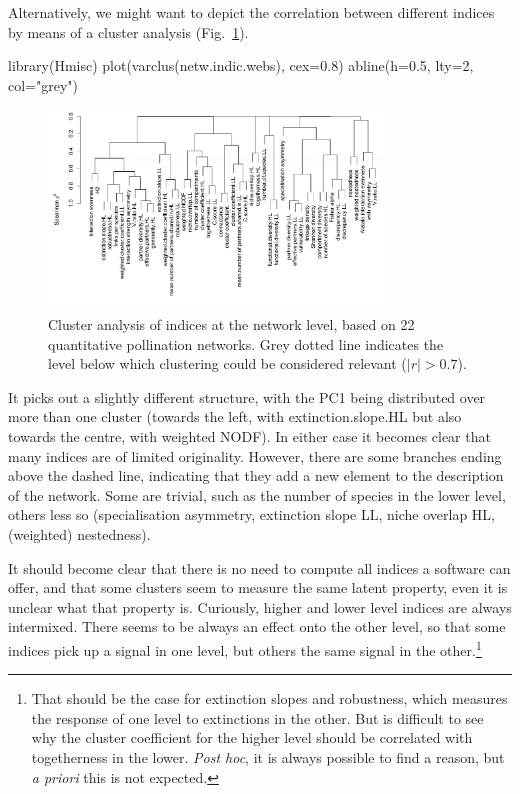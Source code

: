 \documentclass[a4paper, 11pt]{article}\usepackage[]{graphicx}\usepackage[]{color}
\begin{document}
Alternatively, we might want to depict the correlation between different indices by means of a cluster analysis (Fig.~\ref{fig:clusternetworklevel}).
\begin{Schunk}
\begin{Sinput}
library(Hmisc)
plot(varclus(netw.indic.webs), cex=0.8)
abline(h=0.5, lty=2, col="grey")
\end{Sinput}
\end{Schunk}
\begin{figure}
\centering
\includegraphics[width=0.8\textwidth]{figures/clusternetworklevel}
\caption{Cluster analysis of indices at the network level, based on 22 quantitative pollination networks. Grey dotted line indicates the level below which clustering could be considered relevant ($|r| > 0.7$).}
\label{fig:clusternetworklevel}
\end{figure}
%
It picks out a slightly different structure, with the PC1 being distributed over more than one cluster (towards the left, with extinction.slope.HL but also towards the centre, with weighted NODF). In either case it becomes clear that many indices are of limited originality. However, there are some branches ending above the dashed line, indicating that they add a new element to the description of the network. Some are trivial, such as the number of species in the lower level, others less so (specialisation asymmetry, extinction slope LL, niche overlap HL, (weighted) nestedness). 

It should become clear that there is no need to compute all indices a software can offer, and that some clusters seem to measure the same latent property, even it is unclear what that property is. Curiously, higher and lower level indices are always intermixed. There seems to be always an effect onto the other level, so that some indices pick up a signal in one level, but others the same signal in the other.\footnote{That should be the case for extinction slopes and robustness, which measures the response of one level to extinctions in the other. But is difficult to see why the cluster coefficient for the higher level should be correlated with togetherness in the lower. \emph{Post hoc}, it is always possible to find a reason, but \emph{a priori} this is not expected.}
\end{document}
